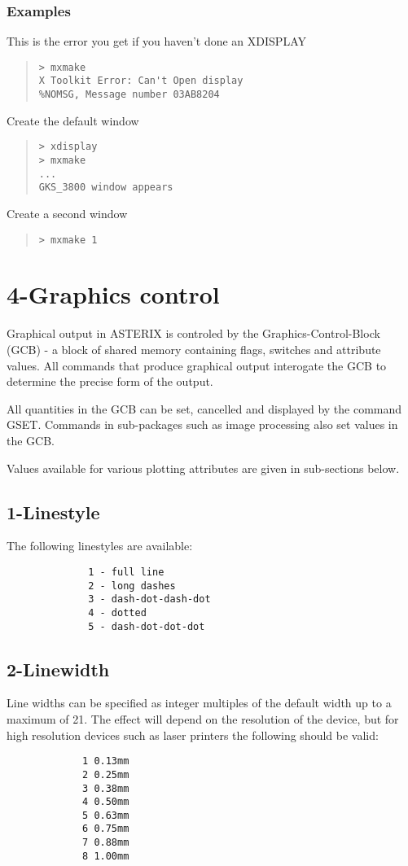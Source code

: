 \documentclass{book}
\renewcommand{\_}{{\tt\char'137}}     %
\begin{document}
\subsubsection{Examples}
This is the error you get if you haven't done an XDISPLAY
\begin{quote}\begin{verbatim}
> mxmake
X Toolkit Error: Can't Open display
%NOMSG, Message number 03AB8204
\end{verbatim}\end{quote}
Create the default window
\begin{quote}\begin{verbatim}
> xdisplay
> mxmake
...
GKS_3800 window appears
\end{verbatim}\end{quote}
Create a second window
\begin{quote}\begin{verbatim}
> mxmake 1
\end{verbatim}\end{quote}
\section{4-Graphics control}
Graphical output in ASTERIX is controled by the Graphics-Control-Block
(GCB) - a block of shared memory containing flags, switches and
attribute values. All commands that produce graphical output
interogate the GCB to determine the precise form of the output.

All quantities in the GCB can be set, cancelled and displayed
by the command GSET. Commands in sub-packages such as image
processing also set values in the GCB.

Values available for various plotting attributes are given in
sub-sections below.

\subsection{1-Linestyle}
The following linestyles are available:
\begin{verbatim}
              1 - full line
              2 - long dashes
              3 - dash-dot-dash-dot
              4 - dotted
              5 - dash-dot-dot-dot
\end{verbatim}
\subsection{2-Linewidth}
Line widths can be specified as integer multiples of the default
width up to a maximum of 21. The effect will depend on the
resolution of the device, but for high resolution devices such
as laser printers the following should be valid:
\begin{verbatim}
             1 0.13mm
             2 0.25mm
             3 0.38mm
             4 0.50mm
             5 0.63mm
             6 0.75mm
             7 0.88mm
             8 1.00mm
\end{verbatim}
\end{document}
